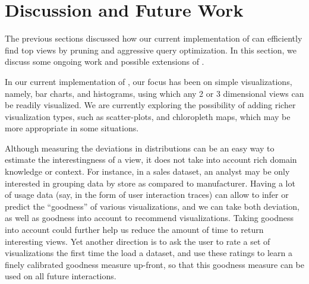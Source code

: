 

\section{Discussion and Future Work}
\label{sec:discussion}
The previous sections discussed how our current implementation of \VizRecDB can
efficiently find top views by pruning and aggressive query optimization.
In this section, we discuss some ongoing work and possible extensions of
\VizRecDB.

 In our current implementation
of \VizRecDB, our focus has been on simple visualizations, namely, bar charts,
and histograms, using which any 2 or 3 dimensional views can be readily visualized.
We are currently exploring the possibility of adding richer visualization types,
such as scatter-plots, and chloropleth maps, which may be more appropriate
in some situations. 

 Although measuring the 
deviations in distributions can be an easy way to estimate the interestingness of a 
view, it does not take into account rich domain knowledge or context.
For instance, in a sales dataset, an analyst may be only interested in grouping
data by store as compared to manufacturer. 
Having a lot of usage data (say, in the form of user interaction traces)
can allow \VizRecDB to infer or predict the ``goodness''
of various visualizations, and we can take both deviation, as well as 
goodness into account to recommend visualizations. 
Taking goodness into account could further help us reduce the amount of time
to return interesting views.
Yet another direction is to ask the user to rate a set of visualizations
the first time the load a dataset, and use these ratings to 
learn a finely calibrated goodness measure up-front,
so that this goodness measure can be used on all future interactions.

 



